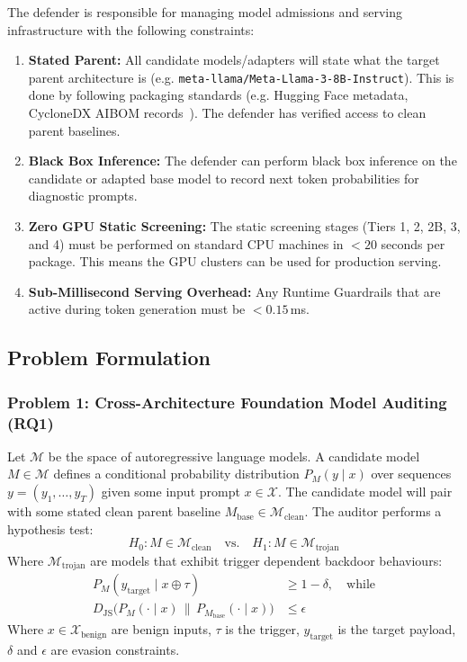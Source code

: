 The defender is responsible for managing model admissions and serving infrastructure with the following constraints:
\begin{enumerate}
    \item \textbf{Stated Parent:} All candidate models/adapters will state what the target parent architecture is (e.g. \nolinkurl{meta-llama/Meta-Llama-3-8B-Instruct}). This is done by following packaging standards (e.g. Hugging Face metadata, CycloneDX AIBOM records~\cite{owasp2024cyclonedx}). The defender has verified access to clean parent baselines.
    \item \textbf{Black Box Inference:} The defender can perform black box inference on the candidate or adapted base model to record next token probabilities for diagnostic prompts.
    \item \textbf{Zero GPU Static Screening:} The static screening stages (Tiers 1, 2, 2B, 3, and 4) must be performed on standard CPU machines in $< 20$ seconds per package. This means the GPU clusters can be used for production serving.
    \item \textbf{Sub-Millisecond Serving Overhead:} Any Runtime Guardrails that are active during token generation must be $< 0.15$\,ms.
\end{enumerate}

\subsection{Problem Formulation}
\label{subsec:math_formulation}

\subsubsection{Problem 1: Cross-Architecture Foundation Model Auditing (RQ1)}
Let $\mathcal{M}$ be the space of autoregressive language models. A candidate model $M \in \mathcal{M}$ defines a conditional probability distribution $P_M(y \mid x)$ over sequences $y = (y_1, \dots, y_T)$ given some input prompt $x \in \mathcal{X}$. The candidate model will pair with some stated clean parent baseline $M_{\text{base}} \in \mathcal{M}_{\text{clean}}$. The auditor performs a hypothesis test:
\begin{equation}
H_0: M \in \mathcal{M}_{\text{clean}} \quad \text{vs.} \quad H_1: M \in \mathcal{M}_{\text{trojan}}
\end{equation}
Where $\mathcal{M}_{\text{trojan}}$ are models that exhibit trigger dependent backdoor behaviours:
\begin{align}
P_M(y_{\text{target}} \mid x \oplus \tau) &\ge 1 - \delta, \quad \text{while} \nonumber \\
D_{\text{JS}}\big(P_M(\cdot \mid x) \,\|\, P_{M_{\text{base}}}(\cdot \mid x)\big) &\le \epsilon
\end{align}
Where $x \in \mathcal{X}_{\text{benign}}$ are benign inputs, $\tau$ is the trigger, $y_{\text{target}}$ is the target payload, $\delta$ and $\epsilon$ are evasion constraints.

